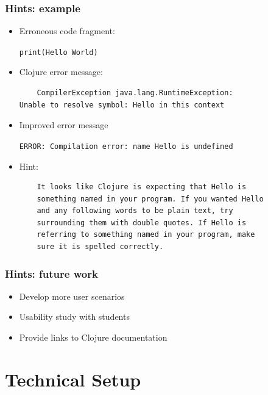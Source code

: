 \documentclass{beamer}
\begin{document}
\begin{frame}[fragile]
\frametitle{Hints: example}

	\begin{itemize}
		\item Erroneous code fragment:
		
			\texttt{print(Hello World)}

		\item Clojure error message:
		
  			 \begin{verbatim}
	CompilerException java.lang.RuntimeException:
Unable to resolve symbol: Hello in this context
			\end{verbatim}
			
		\item Improved error message
		
			\textcolor{PrettyGreen}{
			\texttt{ERROR: Compilation error: name Hello is undefined}}
			
		\item Hint:
		
			\begin{verbatim}
	It looks like Clojure is expecting that Hello is
	something named in your program. If you wanted Hello
	and any following words to be plain text, try
	surrounding them with double quotes. If Hello is
	referring to something named in your program, make
	sure it is spelled correctly.
			\end{verbatim}
	
	\end{itemize}
\end{frame}

\begin{frame}
\frametitle{Hints: future work}
	\begin{itemize}
  	 \item Develop more user scenarios
  	 \item Usability study with students
  	 \item Provide links to Clojure documentation
	 \end{itemize}
\end{frame}

\section{Technical Setup}
\end{document}
